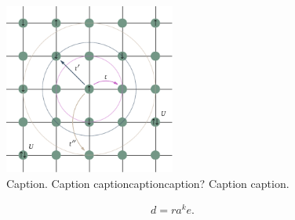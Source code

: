 
\begin{figure}[h!]
    \begin{center}
        \includegraphics[width=0.5\textwidth]{../figs/2d_lattice.pdf}
    \end{center}
    \caption{Caption. Caption captioncaptioncaption? Caption caption.}
    \label{fig: fig_num_2}
\end{figure}

\blindduck

\begin{align}
    \boxed{
        d = ra^k e.
    }
    \label{eq: test_2}
\end{align}

\clearpage

